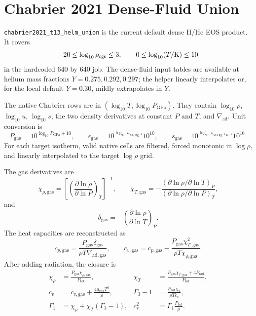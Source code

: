 \documentclass[11pt]{article}
\newcommand{\arad}{a_{\mathrm rad}}
\newcommand{\eps}{\epsilon}
\newcommand{\gammathree}{\Gamma_3-1}
\begin{document}
\section{Chabrier 2021 Dense-Fluid Union}

\texttt{chabrier2021\_t13\_helm\_union} is the current default dense H/He EOS
product.  It covers
\begin{equation}
  -20 \le \log_{10}\rho_{\mathrm{cgs}} \le 3,\qquad
  0 \le \log_{10}(T/{\rm K}) \le 10
\end{equation}
in the hardcoded 640 by 640 job.  The dense-fluid input tables are available
at helium mass fractions $Y=0.275,0.292,0.297$; the helper linearly
interpolates or, for the local default $Y=0.30$, mildly extrapolates in $Y$.

The native Chabrier rows are in $(\log_{10}T,\log_{10}P_{\mathrm{GPa}})$.
They contain $\log_{10}\rho$, $\log_{10}u$, $\log_{10}s$,
the two density derivatives at constant $P$ and $T$, and
$\nabla_{\mathrm{ad}}$.  Unit conversion is
\begin{equation}
  P_{\mathrm{gas}}=10^{\log_{10}P_{\mathrm{GPa}}+10},
  \qquad
  \eps_{\mathrm{gas}}=10^{\log_{10}u_{\mathrm{MJ\,kg^{-1}}}}10^{10},
  \qquad
  s_{\mathrm{gas}}=10^{\log_{10}s_{\mathrm{MJ\,kg^{-1}\,K^{-1}}}}10^{10}.
\end{equation}
For each target isotherm, valid native cells are filtered, forced monotonic in
$\log\rho$, and linearly interpolated to the target $\log\rho$ grid.

The gas derivatives are
\begin{equation}
  \chi_{\rho,\mathrm{gas}} =
  \left[
  \left(\frac{\partial\ln\rho}{\partial\ln P}\right)_T
  \right]^{-1},
  \qquad
  \chi_{T,\mathrm{gas}} =
  -\frac{(\partial\ln\rho/\partial\ln T)_P}
        {(\partial\ln\rho/\partial\ln P)_T},
\end{equation}
and
\begin{equation}
  \delta_{\mathrm{gas}} =
  -\left(\frac{\partial\ln\rho}{\partial\ln T}\right)_P.
\end{equation}
The heat capacities are reconstructed as
\begin{equation}
  c_{p,\mathrm{gas}} =
  \frac{P_{\mathrm{gas}}\delta_{\mathrm{gas}}}
       {\rho T\nabla_{\mathrm{ad,gas}}},
  \qquad
  c_{v,\mathrm{gas}} =
  c_{p,\mathrm{gas}} -
  \frac{P_{\mathrm{gas}}\chi_{T,\mathrm{gas}}^2}
       {\rho T\chi_{\rho,\mathrm{gas}}}.
\end{equation}
After adding radiation, the closure is
\begin{align}
  \chi_\rho &=
  \frac{P_{\mathrm{gas}}\chi_{\rho,\mathrm{gas}}}{P_{\mathrm{tot}}},
&
  \chi_T &=
  \frac{P_{\mathrm{gas}}\chi_{T,\mathrm{gas}}+4P_{\mathrm{rad}}}
       {P_{\mathrm{tot}}},
\\
  c_v &= c_{v,\mathrm{gas}}+\frac{4\arad T^3}{\rho},
&
  \gammathree &= \frac{P_{\mathrm{tot}}\chi_T}{\rho T c_v},
\\
  \Gamma_1 &= \chi_\rho+\chi_T(\Gamma_3-1),
&
  c_s^2 &= \Gamma_1\frac{P_{\mathrm{tot}}}{\rho}.
\end{align}
\end{document}
